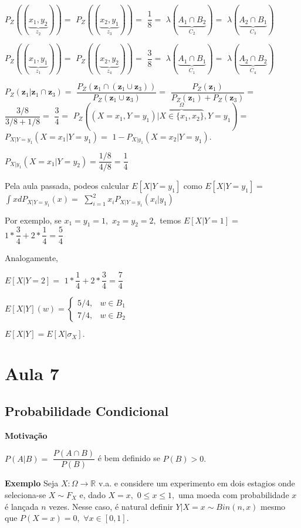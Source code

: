 \documentclass[
]{book}
\begin{document}
\(P_Z((\underbrace{x_1,y_2}_{z_2}))=\) \(P_Z((\underbrace{x_2,y_1}_{z_3}))=\) \(\dfrac{1}{8}=\) \(\lambda(\underbrace{A_1\cap B_2}_{C_2})=\) \(\lambda(\underbrace{A_2\cap B_1}_{C_3})\)

\(P_Z((\underbrace{x_1,y_1}_{z_1}))=\) \(P_Z((\underbrace{x_2,y_2}_{z_4}))=\) \(\dfrac{3}{8}=\) \(\lambda(\underbrace{A_1\cap B_1}_{C_1})=\) \(\lambda(\underbrace{A_2\cap B_2}_{C_4})\)

\(P_Z(\boldsymbol z_1| \boldsymbol z_1 \cap \boldsymbol z_3)=\) \(\dfrac{P_Z(\boldsymbol z_1 \cap (\boldsymbol z_1 \cup \boldsymbol z_3))}{P_Z(\boldsymbol z_1 \cup \boldsymbol z_3)}=\) \(\dfrac{P_Z(\boldsymbol z_1)}{P_Z(\boldsymbol z_1)+P_Z(\boldsymbol z_3)}=\) \(\dfrac{3/8}{3/8 + 1/8}=\) \(\dfrac{3}{4}=\) \(P_Z((X=x_1,Y=y_1)|\overbrace{X \in \{x_1,x_2\}}^{\Omega}, Y=y_1)=\) \(P_{X|Y=y_1}(X=x_1|Y=y_1)=\) \(1-P_{X|y_1}(X=x_2|Y=y_1).\)

\(P_{X|y_1}(X=x_1|Y=y_2)= \dfrac{1/8}{4/8}=\dfrac{1}{4}\)

Pela aula passada, podeos calcular \(E[X|Y=y_1]\) como \(E[X|Y=y_1]=\) \(\int x dP_{X|Y=y_1}(x)=\) \(\sum_{i=1}^2x_i P_{X|Y=y_1}(x_i|y_1)\)

Por exemplo, se \(x_1=y_1=1,\) \(x_2=y_2=2,\) temos \(E[X|Y=1]=\) \(1*\dfrac{3}{4}+2*\dfrac{1}{4}=\dfrac{5}{4}\)

Analogamente,

\(E[X|Y=2]=\) \(1*\dfrac{1}{4}+2*\dfrac{3}{4}=\dfrac{7}{4}\)

\(E[X|Y](w)=\left\{\begin{array}{ll} 5/4, & w \in B_1\\ 7/4, & w \in B_2 \end{array}\right.\)

\(E[X|Y]=E[X|\sigma_X].\)

\hypertarget{aula-7}{%
\section{Aula 7}\label{aula-7}}

\hypertarget{probabilidade-condicional}{%
\subsection{Probabilidade Condicional}\label{probabilidade-condicional}}

\textbf{Motivação}

\(P(A|B)=\) \(\dfrac{P(A\cap B)}{P(B)}\) é bem definido se \(P(B)>0.\)

\textbf{Exemplo} Seja \(X: \Omega \longrightarrow \mathbb{R}\) v.a. e considere um experimento em dois estagios onde seleciona-se \(X\sim F_X\) e, dado \(X=x,\) \(0\leq x\leq 1,\) uma moeda com probabilidade \(x\) é lançada \(n\) vezes. Nesse caso, é natural definir \(Y|X=x\sim Bin(n,x)\) mesmo que \(P(X=x)=0,\) \(\forall x \in [0,1].\)
\end{document}
